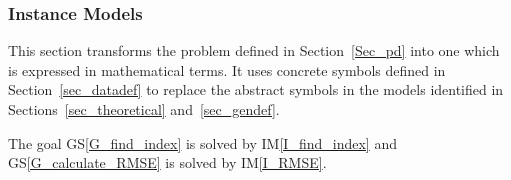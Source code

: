 \documentclass[12pt]{article}
\newcommand{\colAwidth}{0.13\textwidth}
\newcommand{\colBwidth}{0.82\textwidth}
\newcommand{\gsref}[1]{GS\ref{#1}} \newcounter{instnum} %
\newcommand{\iref}[1]{IM\ref{#1}} \newcounter{reqnum} %
\begin{document}




\subsubsection{Instance Models} \label{sec_instance}    


This section transforms the problem defined in Section~\ref{Sec_pd} into one
which is expressed in mathematical terms. It uses concrete symbols defined in
Section~\ref{sec_datadef} to replace the abstract symbols in the models
identified in Sections~\ref{sec_theoretical} and~\ref{sec_gendef}.

The goal \gsref{G_find_index} is solved by \iref{I_find_index} and
\gsref{G_calculate_RMSE} is solved by \iref{I_RMSE}.

~\newline

\end{document}

